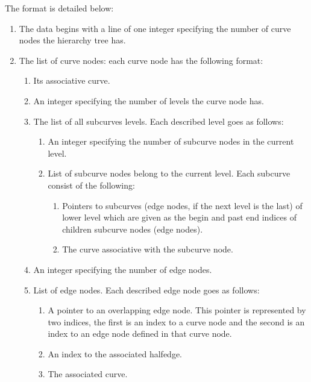\begin{ccAdvanced}
The format is detailed below:

\begin{enumerate}
    \item The data begins with a line of one integer specifying the number 
    of curve nodes the hierarchy tree has.
    \item The list of curve nodes: 
    each curve node has the following format:
    \begin{enumerate}
        \item Its associative curve.
        \item An integer specifying the number of levels the curve node has.
        \item The list of all subcurves levels. Each described level goes as follows:
        \begin{enumerate}
            \item An integer specifying the number of subcurve nodes in the current level.
            \item List of subcurve nodes belong to the current level. 
            Each subcurve consist of the following:
            \begin{enumerate}
                \item Pointers to subcurves (edge nodes, if the next level is the last) 
                of lower level which are given as the begin and past end indices 
                of children subcurve nodes (edge nodes).
                \item The curve associative with the subcurve node.
            \end{enumerate}
        \end{enumerate}
        \item An integer specifying the number of edge nodes.
        \item List of edge nodes. Each described edge node goes as follows:
        \begin{enumerate}
            \item A pointer to an overlapping edge node.
            This pointer is represented by two indices, the first is an index to a curve node 
            and the second is an index to an edge node defined in that curve node.
            \item An index to the associated halfedge.
            \item The associated curve.
        \end{enumerate}    
    \end{enumerate}
\end{enumerate}


\end{ccAdvanced}
